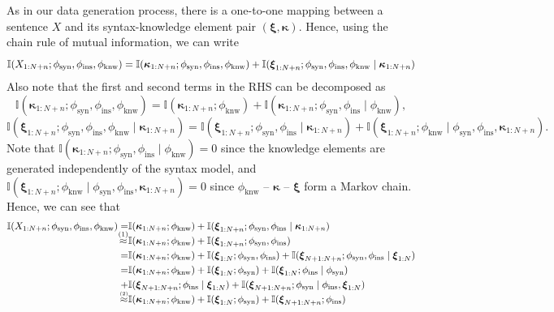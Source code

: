 \documentclass[11pt]{article}
\theoremstyle{plain}
\theoremstyle{definition}
\newcommand{\knwModel}{\phi_{\text{knw}}}
\newcommand{\synModel}{\phi_{\text{syn}}}
\newcommand{\instructionModel}{\phi_{\text{ins}}}
\newcommand{\Knwelem}{\boldsymbol{\kappa}}
\newcommand{\Synelem}{\boldsymbol{\xi}}
\begin{document}
As in our data generation process, there is a one-to-one mapping between
a sentence $X$ and its syntax-knowledge element pair $(\Synelem,\Knwelem)$.
Hence, using the chain rule of mutual information, we can write
$$
    \mathbb{I}(X_{1:N+n}; \synModel, \instructionModel, \knwModel) \notag
    = \mathbb{I}(\Knwelem_{1:N+n}; \synModel, \instructionModel, \knwModel)
    +\mathbb{I}(\Synelem_{1:N+n}; \synModel, \instructionModel, \knwModel\mid\Knwelem_{1:N+n}) 
$$
Also note that the first and second terms in the RHS can be decomposed as
$$
\mathbb{I}(\Knwelem_{1:N+n}; \synModel, \instructionModel, \knwModel)
=\mathbb{I}(\Knwelem_{1:N+n}; \knwModel)+\mathbb{I}(\Knwelem_{1:N+n}; \synModel,\instructionModel\mid\knwModel),
$$
$$
\mathbb{I}(\Synelem_{1:N+n}; \synModel, \instructionModel, \knwModel\mid\Knwelem_{1:N+n}) 
=
\mathbb{I}(\Synelem_{1:N+n}; \synModel, \instructionModel\mid\Knwelem_{1:N+n})+
\mathbb{I}(\Synelem_{1:N+n}; \knwModel\mid\synModel, \instructionModel,\Knwelem_{1:N+n}). 
$$
Note that
$\mathbb{I}(\Knwelem_{1:N+n}; \synModel,\instructionModel\mid\knwModel)=0$
since the knowledge elements are generated independently of the syntax model,
and 
$\mathbb{I}(\Synelem_{1:N+n}; \knwModel\mid\synModel, \instructionModel,\Knwelem_{1:N+n})=0$
since $\knwModel$ -- $\Knwelem$ -- $\Synelem$ form a Markov chain.
Hence, we can see that
\begin{align}
    \mathbb{I}(X_{1:N+n}; \synModel, \instructionModel, \knwModel)
     =& \mathbb{I}(\Knwelem_{1:N+n}; \knwModel)+\mathbb{I}(\Synelem_{1:N+n}; \synModel,\instructionModel\mid\Knwelem_{1:N+n}) \notag
    \\ 
    \smash{\overset{\scriptstyle (1)}{\approx}}& \mathbb{I}(\Knwelem_{1:N+n}; \knwModel)+\mathbb{I}(\Synelem_{1:N+n}; \synModel,\instructionModel)  \notag
    \\ 
    =& \mathbb{I}(\Knwelem_{1:N+n}; \knwModel)+\mathbb{I}(\Synelem_{1:N}; \synModel,\instructionModel)+\mathbb{I}(\Synelem_{N+1:N+n}; \synModel,\instructionModel\mid\Synelem_{1:N}) \notag
    \\ 
    =& \mathbb{I}(\Knwelem_{1:N+n}; \knwModel)+\mathbb{I}(\Synelem_{1:N}; \synModel)+\mathbb{I}(\Synelem_{1:N}; \instructionModel\mid\synModel) \notag \\
    +&\mathbb{I}(\Synelem_{N+1:N+n}; \instructionModel\mid\Synelem_{1:N})+\mathbb{I}(\Synelem_{N+1:N+n}; \synModel\mid\instructionModel,\Synelem_{1:N})  \notag
    \\ 
    \smash{\overset{\scriptscriptstyle (2)}{\approx}}& \mathbb{I}(\Knwelem_{1:N+n}; \knwModel)+\mathbb{I}(\Synelem_{1:N}; \synModel)+\mathbb{I}(\Synelem_{N+1:N+n}; \instructionModel) \notag
\end{align}
\end{document}
